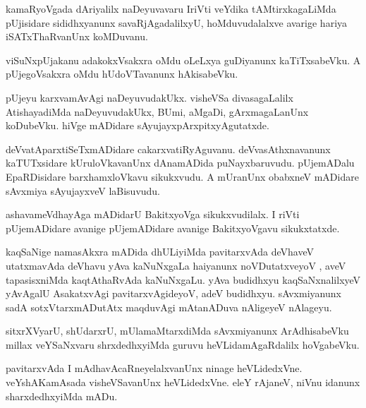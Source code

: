 \documentclass{article}
\begin{document}
\begin{mn}%
kamaRyoVgada dAriyalilx naDeyuvavaru IriVti veYdika tAMtirxkagaLiMda pUjisidare 
sididhxyanunx savaRjAgadalilxyU, hoMduvudalalxve avarige hariya iSATxThaRvanUnx koMDuvanu.
\end{mn}

\begin{mn}%
viSuNxpUjakanu adakokxVsakxra oMdu oLeLxya guDiyanunx kaTiTxsabeVku. A pUjegoVsakxra oMdu 
hUdoVTavanunx hAkisabeVku.
\end{mn}

\begin{mn}%
pUjeyu karxvamAvAgi naDeyuvudakUkx. visheVSa divasagaLalilx AtishayadiMda naDeyuvudakUkx, 
BUmi, aMgaDi, gArxmagaLanUnx koDubeVku. hiVge mADidare sAyujayxpArxpitxyAgutatxde.
\end{mn}

\begin{mn}%
deVvatAparxtiSeTxmADidare cakarxvatiRyAguvanu. deVvasAthxnavanunx kaTUTxsidare 
kUruloVkavanUnx dAnamADida puNayxbaruvudu. pUjemADalu EpaRDisidare barxhamxloVkavu 
sikukxvudu. A mUranUnx obabxneV mADidare sAvxmiya sAyujayxveV laBisuvudu.
\end{mn}

\begin{mn}%
ashavameVdhayAga mADidarU BakitxyoVga sikukxvudilalx. I riVti pUjemADidare avanige 
pUjemADidare avanige BakitxyoVgavu sikukxtatxde.
\end{mn}

\begin{mn}%
kaqSaNige namasAkxra mADida dhULiyiMda pavitarxvAda deVhaveV utatxmavAda deVhavu yAva 
kaNuNxgaLa haiyanunx noVDutatxveyoV , aveV tapasisxniMda kaqtAthaRvAda kaNuNxgaLu. yAva 
budidhxyu kaqSaNxnalilxyeV yAvAgalU AsakatxvAgi pavitarxvAgideyoV, adeV budidhxyu. 
sAvxmiyanunx sadA sotxVtarxmADutAtx maqduvAgi mAtanADuva nAligeyeV nAlageyu.
\end{mn}

\begin{mn}%
sitxrXVyarU, shUdarxrU, mUlamaMtarxdiMda sAvxmiyanunx ArAdhisabeVku millax veYSaNxvaru 
shrxdedhxyiMda guruvu heVLidamAgaRdalilx hoVgabeVku.
\end{mn}

\begin{mn}%
pavitarxvAda I mAdhavAcaRneyelalxvanUnx ninage heVLidedxVne. veYshAKamAsada visheVSavanUnx 
heVLidedxVne. eleY rAjaneV, niVnu idanunx sharxdedhxyiMda mADu.
\end{mn}
\end{document}
